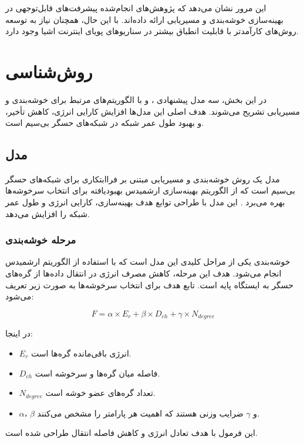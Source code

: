 \documentclass[12pt, onecolumn, a4paper]{article}
\begin{document}
	
	این مرور نشان می‌دهد که پژوهش‌های انجام‌شده پیشرفت‌های قابل‌توجهی در بهینه‌سازی خوشه‌بندی و مسیریابی ارائه داده‌اند. با این حال، همچنان نیاز به توسعه روش‌های کارآمدتر با قابلیت انطباق بیشتر در سناریوهای پویای اینترنت اشیا وجود دارد.
\newpage
	
\section{روش‌شناسی}

در این بخش، سه مدل پیشنهادی ،  و  با الگوریتم‌های مرتبط برای خوشه‌بندی و مسیریابی تشریح می‌شوند. هدف اصلی این مدل‌ها افزایش کارایی انرژی، کاهش تأخیر، و بهبود طول عمر شبکه در شبکه‌های حسگر بی‌سیم است.

\subsection{مدل }
مدل  یک روش خوشه‌بندی و مسیریابی مبتنی بر فراابتکاری برای شبکه‌های حسگر بی‌سیم است که از الگوریتم بهینه‌سازی ارشمیدس بهبودیافته برای انتخاب سرخوشه‌ها بهره می‌برد \cite{ref7, ref8}. این مدل با طراحی توابع هدف بهینه‌سازی، کارایی انرژی و طول عمر شبکه را افزایش می‌دهد.

\subsubsection{مرحله خوشه‌بندی}
خوشه‌بندی یکی از مراحل کلیدی این مدل است که با استفاده از الگوریتم ارشمیدس انجام می‌شود. هدف این مرحله، کاهش مصرف انرژی در انتقال داده‌ها از گره‌های حسگر به ایستگاه پایه است. تابع هدف برای انتخاب سرخوشه‌ها به صورت زیر تعریف می‌شود:

\begin{equation}
	F = \alpha \times E_r + \beta \times D_{ch} + \gamma \times N_{degree}
\end{equation}

در اینجا:
\begin{itemize}
	\item $E_r$ انرژی باقی‌مانده گره‌ها است.
	\item $D_{ch}$ فاصله میان گره‌ها و سرخوشه است.
	\item $N_{degree}$ تعداد گره‌های عضو خوشه است.
	\item $\alpha$، $\beta$ و $\gamma$ ضرایب وزنی هستند که اهمیت هر پارامتر را مشخص می‌کنند.
\end{itemize}

این فرمول با هدف تعادل انرژی و کاهش فاصله انتقال طراحی شده است.
\end{document}

